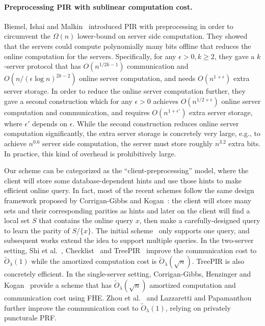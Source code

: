 \paragraph{Preprocessing PIR with sublinear computation cost.} 
Biemel, Ishai and Malkin~\cite{bim-pir} introduced PIR with preprocessing in order to circumvent the $\Omega(n)$ lower-bound on server side computation. They showed that the servers could compute polynomially many bits offline that reduces the online computation for the servers. Specifically, for any $\epsilon>0,k\ge 2$, they gave a $k$-server protocol that has $O(n^{1/2k-1})$ communication and $O(n/(\epsilon\log n)^{2k-2})$ online server computation, and needs $O(n^{1+\epsilon})$ extra server storage. In order to reduce the online server computation further, they gave a second construction which for any $\epsilon>0$ achieves $O(n^{1/2+\epsilon})$ online server computation and communication, and requires $O(n^{1+\epsilon'})$ extra server storage, where $\epsilon'$ depends on $\epsilon$. While the second construction reduces online server computation significantly, the extra server storage is concretely very large, e.g., to achieve $n^{0.6}$ server side computation, the server must store roughly $n^{3.2}$ extra bits. In practice, this kind of overhead is prohibitively large.

Our scheme can be categorized as the ``client-preprocessing'' model, where the client will store some database-dependent hints and use those hints to make efficient online query. 
In fact, most of the recent schemes follow the same design framework proposed by Corrigan-Gibbs and Kogan~\cite{sublinearpir}: the client will store many sets and their corresponding parities as hints and later on the client will find a local set $S$ that contains the online query $x$, then make a carefully-designed query to learn the parity of $S/\{x\}$. 
The initial scheme~\cite{sublinearpir} only supports one query, and subsequent works extend the idea to support multiple queries. 
In the two-server setting, Shi et al.~\cite{shi-pir}, Checklist~\cite{checklist} and TreePIR~\cite{treepir} improve the communication cost to $\widetilde{O}_\lambda(1)$ while the amortized computation cost is $\widetilde{O}_\lambda(\sqrt{n})$. TreePIR is also concretely efficient.
In the single-server setting, Corrigan-Gibbs, Henzinger and Kogan~\cite{pir-ec22} provide a scheme that has $\widetilde{O}_\lambda(\sqrt{n})$ amortized computation and communication cost using FHE. Zhou et al.~\cite{pir-ec23} and Lazzaretti and Papamanthou~\cite{lazza-pir} further improve the communication cost to $\widetilde{O}_\lambda(1)$, relying on privately puncturale PRF. 

